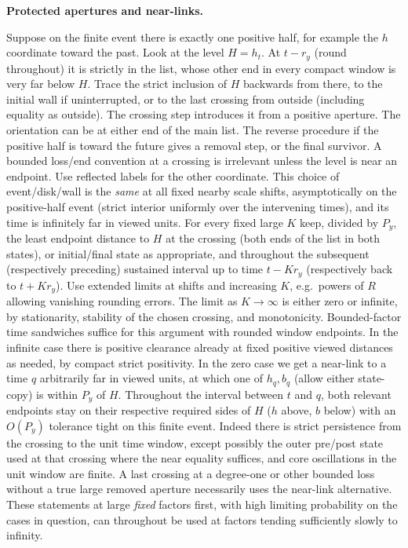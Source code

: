 \smallskip
\noindent\textbf{Protected apertures and near-links.}\quad

Suppose on the finite event there is exactly one positive half, for example the \(h\)
coordinate toward the past. Look at the level \(H=h_t\). At \(t-r_y\) (round throughout)
it is strictly in the list, whose other end in every compact window is very far below
\(H\). Trace the strict inclusion of \(H\) backwards from there, to the initial wall if
uninterrupted, or to the last crossing from outside (including equality as outside). The
crossing step introduces it from a positive aperture. The orientation can be at either end
of the main list. The reverse procedure if the positive half is toward the future gives a
removal step, or the final survivor. A bounded loss/end convention at a crossing is
irrelevant unless the level is near an endpoint. Use reflected labels for the other
coordinate. This choice of event/disk/wall is the \emph{same} at all fixed nearby scale
shifts, asymptotically on the positive-half event (strict interior uniformly over the
intervening times), and its time is infinitely far in viewed units. For every fixed large
\(K\) keep, divided by \(P_y\), the least endpoint distance to \(H\) at the crossing (both
ends of the list in both states), or initial/final state as appropriate, and throughout
the subsequent (respectively preceding) sustained interval up to time \(t-Kr_y\)
(respectively back to \(t+Kr_y\)). Use extended limits at shifts and increasing \(K\),
e.g.~powers of \(R\) allowing vanishing rounding errors. The limit as \(K\to\infty\) is
either zero or infinite, by stationarity, stability of the chosen crossing, and
monotonicity. Bounded-factor time sandwiches suffice for this argument with rounded window
endpoints. In the infinite case there is positive clearance already at fixed positive
viewed distances as needed, by compact strict positivity. In the zero case we get a
near-link to a time \(q\) arbitrarily far in viewed units, at which one of \(h_q,b_q\)
(allow either state-copy) is within \(P_y\) of \(H\). Throughout the interval between
\(t\) and \(q\), both relevant endpoints stay on their respective required sides of \(H\)
(\(h\) above, \(b\) below) with an \(O(P_y)\) tolerance tight on this finite event. Indeed
there is strict persistence from the crossing to the unit time window, except possibly the
outer pre/post state used at that crossing where the near equality suffices, and core
oscillations in the unit window are finite. A last crossing at a degree-one or other
bounded loss without a true large removed aperture necessarily uses the near-link
alternative. These statements at large \emph{fixed} factors first, with high limiting
probability on the cases in question, can throughout be used at factors tending
sufficiently slowly to infinity.

